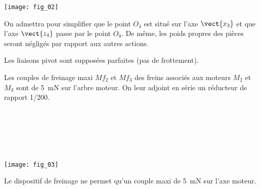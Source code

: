 \begin{marginfigure}
\texttt{[image: fig\_02]}
\end{marginfigure}

On admettra pour simplifier que le point $O_4$ est situé sur l’axe  $\vect{x_3}$ et que l’axe $\vect{z_4}$ passe par le 
point  $O_9$.  De  même,  les  poids  propres  des  pièces  seront  négligés  par  rapport  aux  autres 
actions. 

Les liaisons pivot sont supposées parfaites (pas de frottement). 

Les  couples de  freinage maxi $Mf_2$ et $Mf_3$ des  freins  associés  aux moteurs $M_2$ et $M_3$ sont de 
\SI{5}{mN} sur l’arbre moteur. On leur adjoint en série un réducteur de rapport 1/200. 



\ifprof
\begin{corrige}~\\

\end{corrige}
\else
\fi


\ifprof
\begin{corrige}~\\

\end{corrige}
\else
\fi

\ifprof
\begin{corrige}~\\

\end{corrige}
\else
\fi

\begin{center}
\texttt{[image: fig\_03]}
\end{center}

Le dispositif de freinage ne permet qu’un couple maxi de \SI{5}{mN} sur l’axe moteur.

\ifprof
\begin{corrige}~\\

\end{corrige}
\else
\fi


